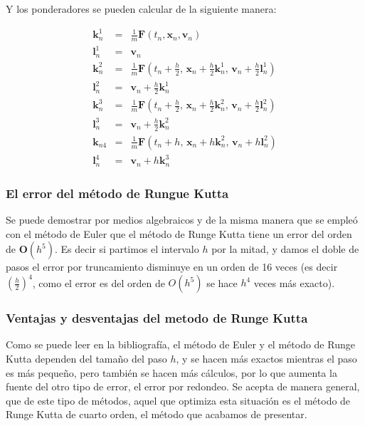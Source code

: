 Y los ponderadores se pueden calcular de la siguiente manera:

\begin{eqnarray}
\textbf{k}_{n}^{1} & = & \frac{1}{m}\textbf{F}(t_n, \textbf{x}_n, \textbf{v}_n) \nonumber \\
\textbf{l}_{n}^{1} & = & \textbf{v}_n \nonumber \\
\textbf{k}_{n}^{2} & = & \frac{1}{m}\textbf{F}(t_n + \frac{h}{2}, \, \textbf{x}_n + \frac{h}{2}\textbf{k}_{n}^{1}, \, \textbf{v}_n + \frac{h}{2}\textbf{l}_{n}^{1}) \nonumber \\
\textbf{l}_{n}^{2} & = & \textbf{v}_n + \frac{h}{2}\textbf{k}_{n}^{1} \nonumber \\
\textbf{k}_{n}^{3} & = & \frac{1}{m}\textbf{F}(t_n + \frac{h}{2}, \, \textbf{x}_n + \frac{h}{2}\textbf{k}_{n}^{2}, \, \textbf{v}_n + \frac{h}{2}\textbf{l}_{n}^{2}) \nonumber \\
\textbf{l}_{n}^{3} & = & \textbf{v}_n + \frac{h}{2}\textbf{k}_{n}^{2} \nonumber \\
\textbf{k}_{n4} & = & \frac{1}{m}\textbf{F}(t_n + h, \, \textbf{x}_n +h\textbf{k}_{n}^{2}, \, \textbf{v}_n + h\textbf{l}_{n}^{2}) \nonumber \\
\textbf{l}_{n}^{4} & = & \textbf{v}_n + h\textbf{k}_{n}^{3}
\label{ponderadores:RK4}
\end{eqnarray}

\subsubsection{El error del método de Rungue Kutta}
Se puede demostrar por medios algebraicos y de la misma manera que se empleó con el método de Euler que el método de Runge Kutta tiene un error del orden de $\textbf{O}(h^5)$.
Es decir si partimos el intervalo $h$ por la mitad, y damos el doble de pasos el error por truncamiento disminuye en un orden de 16 veces (es decir $\left( \frac{h}{2} \right)^4$, como el error es del orden de $O(h^5)$ se hace $h^4$ veces más exacto).

\subsubsection{Ventajas y desventajas del metodo de Runge Kutta}
Como se puede leer en la bibliografía, el método de Euler y el método de Runge Kutta dependen del tamaño del paso $h$, y se hacen más exactos mientras el paso es más pequeño, pero también se hacen más cálculos, por lo que aumenta la fuente del otro tipo de error, el error por redondeo.
Se acepta de manera general, que de este tipo de métodos, aquel que optimiza esta situación es el método de Runge Kutta de cuarto orden, el método que acabamos de presentar.

